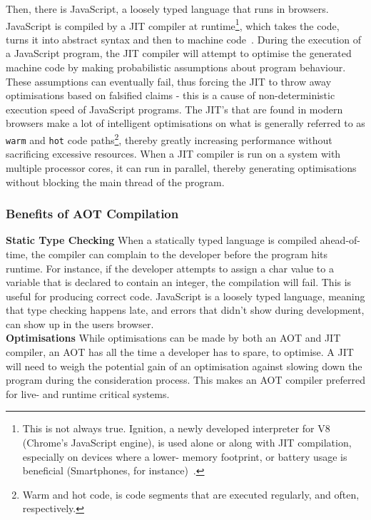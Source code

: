 \documentclass[a4paper]{article}
\begin{document}
Then, there is JavaScript, a loosely typed language that runs in browsers. JavaScript is compiled by a JIT compiler at runtime\footnote{This is not always true. Ignition, a newly developed interpreter for V8 (Chrome's JavaScript engine), is used alone or along with JIT compilation, especially on devices where a lower- memory footprint, or battery usage is beneficial (Smartphones, for instance)~\cite{video:thompson-js-perf-v8-and-wasm}.}, which takes the code, turns it into abstract syntax and then to machine code~\cite[p.~13]{slides:lund-v8}. During the execution of a JavaScript program, the JIT compiler will attempt to optimise the generated machine code by making probabilistic assumptions about program behaviour. These assumptions can eventually fail, thus forcing the JIT to throw away optimisations based on falsified claims - this is a cause of non-deterministic execution speed of JavaScript programs. The JIT's that are found in modern browsers make a lot of intelligent optimisations on what is generally referred to as \texttt{warm} and \texttt{hot} code paths\footnote{Warm and hot code, is code segments that are executed regularly, and often, respectively.}, thereby greatly increasing performance without sacrificing excessive resources. When a JIT compiler is run on a system with multiple processor cores, it can run in parallel, thereby generating optimisations without blocking the main thread of the program.

\subsubsection{Benefits of AOT Compilation}
\textbf{Static Type Checking} When a statically typed language is compiled ahead-of-time, the compiler can complain to the developer before the program hits runtime. For instance, if the developer attempts to assign a char value to a variable that is declared to contain an integer, the compilation will fail. This is useful for producing correct code. JavaScript is a loosely typed language, meaning that type checking happens late, and errors that didn't show during development, can show up in the users browser.\\

\noindent \textbf{Optimisations} While optimisations can be made by both an AOT and JIT compiler, an AOT has all the time a developer has to spare, to optimise. A JIT will need to weigh the potential gain of an optimisation against slowing down the program during the consideration process. This makes an AOT compiler preferred for live- and runtime critical systems.
\end{document}
